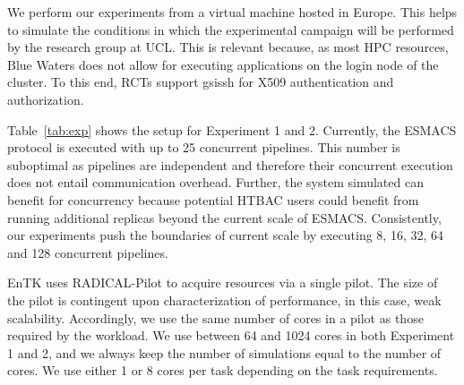 We perform our experiments from a virtual machine hosted in Europe. This
helps to simulate the conditions in which the experimental campaign will be
performed by the research group at UCL\@. This is relevant because, as most
HPC resources, Blue Waters does not allow for executing applications on the
login node of the cluster. To this end, RCTs support \textmd{gsissh} for X509
authentication and authorization.

Table~\ref{tab:exp} shows
the setup for Experiment 1 and 2. Currently, the ESMACS protocol is executed
with up to 25 concurrent pipelines. This number is suboptimal as pipelines
are independent and therefore their concurrent execution does not entail
communication overhead. Further, the system simulated can benefit for
concurrency because potential HTBAC users could benefit from running
additional replicas beyond the current scale of ESMACS\@. Consistently, our
experiments push the boundaries of current scale by executing 8, 16, 32, 64
and 128 concurrent pipelines.


EnTK uses RADICAL-Pilot to acquire resources via a single pilot. 
The size of the pilot is contingent upon characterization of performance, in
this case, weak %
scalability. %
Accordingly, we %
use the same number of cores in a pilot %
as %
those required by the workload. 
We use between 64 and 1024 cores in both Experiment 1 and 2, and we always
keep the number of simulations %
equal to the number of cores. %
We 
use either 1 or 8 cores per task %
depending on the task requirements.


